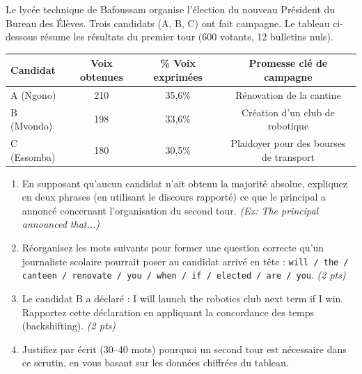 \documentclass[11pt]{article}
\begin{document}
\begin{exercice}
Le lycée technique de Bafoussam organise l'élection du nouveau Président du Bureau des Élèves. Trois candidats (A, B, C) ont fait campagne. Le tableau ci-dessous résume les résultats du premier tour (600 votants, 12 bulletins nuls).

\begin{center}
\begin{tabular}{|l|c|c|c|}
\hline
\textbf{Candidat} & \textbf{Voix obtenues} & \textbf{\% Voix exprimées} & \textbf{Promesse clé de campagne} \\
\hline
A (Ngono) & 210 & 35,6\% & Rénovation de la cantine \\
B (Mvondo) & 198 & 33,6\% & Création d'un club de robotique \\
C (Essomba) & 180 & 30,5\% & Plaidoyer pour des bourses de transport \\
\hline
\end{tabular}
\end{center}

\begin{enumerate}
\item En supposant qu'aucun candidat n'ait obtenu la majorité absolue, expliquez en deux phrases (en utilisant le discours rapporté) ce que le principal a annoncé concernant l'organisation du second tour. \textit{(Ex: The principal announced that...)}
\item Réorganisez les mots suivants pour former une question correcte qu'un journaliste scolaire pourrait poser au candidat arrivé en tête : \texttt{will / the / canteen / renovate / you / when / if / elected / are / you}. \textit{(2 pts)}
\item Le candidat B a déclaré : \og I will launch the robotics club next term if I win.\fg{} Rapportez cette déclaration en appliquant la concordance des temps (backshifting). \textit{(2 pts)}
\item Justifiez par écrit (30--40 mots) pourquoi un second tour est nécessaire dans ce scrutin, en vous basant sur les données chiffrées du tableau.
\end{enumerate}
\end{exercice}
\end{document}
